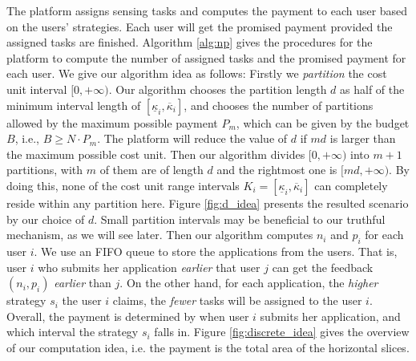 \documentclass[conference]{IEEEtran}
\theoremstyle{definition}
\begin{document}
The platform assigns sensing tasks and computes the payment to each user based on the users' strategies. Each user will get the promised payment provided the assigned tasks are finished. Algorithm \ref{alg:np} gives the procedures for the platform to compute the number of assigned tasks and the promised payment for each user. 
{\color{black}We give our algorithm idea as follows:
\relax
\bolditem Firstly we {\it partition} the cost unit interval $[0, +\infty)$. Our algorithm chooses the partition length $d$ as half of the minimum interval length of $[\underline{\kappa}_i, \overline{\kappa}_i]$, and chooses the number of partitions allowed by the maximum possible payment $P_m$, {\color{blue}which can be given by the budget $B$, i.e., $B\geq N\cdot P_m$}. The platform will reduce the value of $d$ if $md$ is larger than the maximum possible cost unit. Then our algorithm divides $[0, +\infty)$ into $m+1$ partitions, with $m$ of them are of length $d$ and the rightmost one is $[md, +\infty)$. By doing this, none of the cost unit range intervals $K_i=[\underline{\kappa}_i, \overline{\kappa}_i]$ can completely reside within any partition here. Figure \ref{fig:d_idea} presents the resulted scenario by our choice of $d$. Small partition intervals may be beneficial to our truthful mechanism, as we will see later. 
\bolditem Then our algorithm computes $n_i$ and $p_i$ for each user $i$. {\color{blue}We use an FIFO queue to store the applications from the users. That is, user $i$ who submits her application \emph{earlier} that user $j$ can get the feedback $(n_i, p_i)$ \emph{earlier} than $j$. On the other hand, for each application, the {\it higher} strategy $s_i$ the user $i$ claims, the {\it fewer} tasks will be assigned to the user $i$. Overall, the payment is determined by when user $i$ submits her application, and which interval the strategy $s_i$ falls in.} Figure \ref{fig:discrete_idea} gives the overview of our computation idea, i.e. the payment is the total area of the horizontal slices.
}
\end{document}
